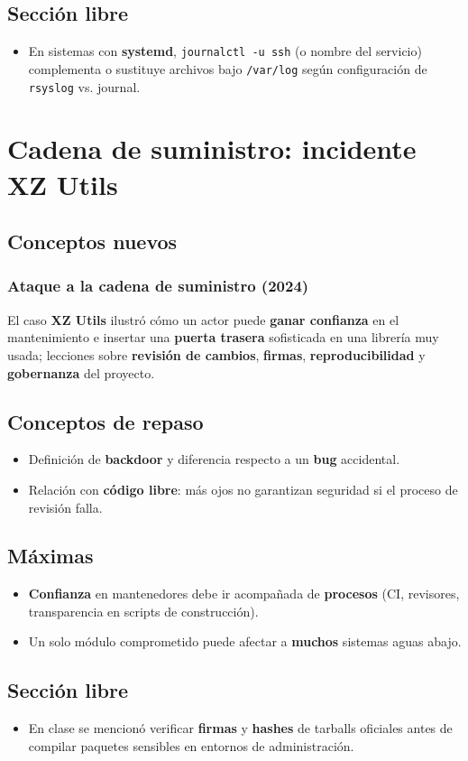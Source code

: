 \documentclass[11pt, letterpaper]{article}
\begin{document}
\subsection{Sección libre}
\label{sec:org5b8a68c}

\begin{itemize}
\item En sistemas con \textbf{systemd}, \texttt{journalctl -u ssh} (o nombre del servicio) complementa o sustituye archivos bajo \texttt{/var/log} según configuración de \texttt{rsyslog} vs. journal.
\end{itemize}
\section{Cadena de suministro: incidente XZ Utils}
\label{sec:org912fc39}

\subsection{Conceptos nuevos}
\label{sec:orgc5d0853}

\subsubsection{Ataque a la cadena de suministro (2024)}
\label{sec:org8d749fd}
El caso \textbf{XZ Utils} ilustró cómo un actor puede \textbf{ganar confianza} en el mantenimiento e insertar una \textbf{puerta trasera} sofisticada en una librería muy usada; lecciones sobre \textbf{revisión de cambios}, \textbf{firmas}, \textbf{reproducibilidad} y \textbf{gobernanza} del proyecto.
\subsection{Conceptos de repaso}
\label{sec:org14c3626}

\begin{itemize}
\item Definición de \textbf{backdoor} y diferencia respecto a un \textbf{bug} accidental.
\item Relación con \textbf{código libre}: más ojos no garantizan seguridad si el proceso de revisión falla.
\end{itemize}
\subsection{Máximas}
\label{sec:orgc085692}

\begin{itemize}
\item \textbf{Confianza} en mantenedores debe ir acompañada de \textbf{procesos} (CI, revisores, transparencia en scripts de construcción).
\item Un solo módulo comprometido puede afectar a \textbf{muchos} sistemas aguas abajo.
\end{itemize}
\subsection{Sección libre}
\label{sec:org8d0728f}

\begin{itemize}
\item En clase se mencionó verificar \textbf{firmas} y \textbf{hashes} de tarballs oficiales antes de compilar paquetes sensibles en entornos de administración.
\end{itemize}
\end{document}

